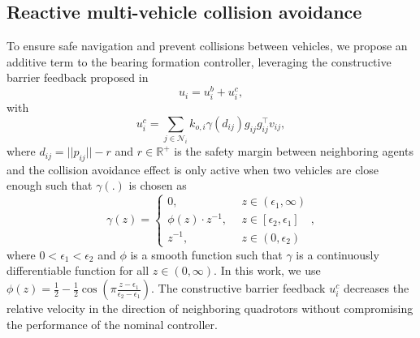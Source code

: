 \subsection{Reactive multi-vehicle collision avoidance}%
To ensure safe navigation and prevent collisions between vehicles, we propose an additive term to the bearing formation controller, leveraging the constructive barrier feedback proposed in \cite{collision}
\begin{equation}
	u_i = u_i^{b} + u_i^{c},
\end{equation}
with
\begin{equation}
	u_i^{c} = \sum_{j\in \mathcal N_i} k_{o,i}\gamma(d_{ij}) g_{ij}g_{ij}^\top v_{ij},
\end{equation}
where $d_{ij}=||p_{ij}|| - r$ and $r\in \mathbb{R}^{+}$ is the safety margin between neighboring agents and the collision avoidance effect is only active when two vehicles are close enough such that $\gamma(.)$ is chosen as
\begin{equation}
\gamma(z)=\left\{ \begin{aligned}
    0, &\ \ z\in (\epsilon_1,\infty)\\
    \phi(z) \cdot z^{-1}, & \ \ z\in [\epsilon_2,\epsilon_1]\\
    z^{-1}, &\ \ z\in (0,\epsilon_2)
\end{aligned}\right.,
\end{equation}
where $0<\epsilon_1<\epsilon_2$ and $\phi$ is a smooth function such that $\gamma$ is a continuously differentiable function for all $z\in(0,\infty)$. In this work, we use $\phi(z)=\frac{1}{2}-\frac{1}{2}\cos(\pi\frac{z-\epsilon_1}{\epsilon_2-\epsilon_1})$.
The constructive barrier feedback $u_i^c$ decreases the relative velocity in the direction of neighboring quadrotors without compromising
the performance of the nominal controller.

